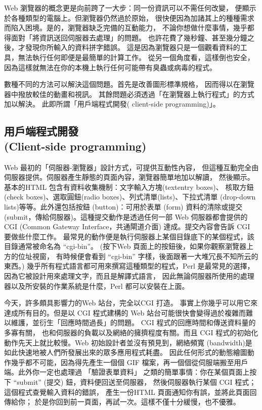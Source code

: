Web 瀏覽器的概念更是向前跨了一大步：同一份資訊可以不需任何改變，
便顯示於各種類型的電腦上。但瀏覽器仍然過於原始，
很快便因為加諸其上的種種需求而陷入困境。是的，瀏覽器缺乏完備的互動能力，
不論你想做什麼事情，幾乎都得面對「將資訊送回伺服器去處理」的問題。
也許花費了幾秒鐘、甚至幾分鐘之後，才發現你所輸入的資料拼字錯誤。
這是因為瀏覽器只是一個觀看資料的工具，無法執行任何即便是最簡單的計算工作。
從另一個角度看，這樣倒也安全，
因為這樣就無法在你的本機上執行任何可能帶有臭蟲或病毒的程式。 

數種不同的方法可以解決這個問題。首先是改善圖形標準規格，
因而得以在瀏覽器中撥放較佳的動畫和視訊。
其餘問題必須透過「在瀏覽器上執行程式」的方式加以解決。
此即所謂「用戶端程式開發( client-side programming)」。
\subsection{用戶端程式開發 \\(Client-side programming)}
Web 最初的「伺服器-瀏覽器」設計方式，可提供互動性內容，
但這種互動完全由伺服器提供。伺服器產生靜態的頁面內容，瀏覽器簡單地加以解讀，
然後顯示。基本的HTML 包含有資料收集機制：文字輸入方塊(textentry boxes)、
核取方鈕(check boxes)、選取圓鈕(radio boxes)、列式清單(lists)、下拉式清單
(drop-down lists)等等。此外還包括按鈕 (button)：可用於表單 (form)
資料的清除或提交(submit，傳給伺服器)。這種提交動作是透過任何一部
Web 伺服器都會提供的 CGI (Common Gateway Interface，共通閘道介面)
達成。提交內容會告訴 CGI 要做些什麼工作。
最常見的動作便是執行伺服器上某個目錄底下的某個程式，該目錄通常被命名為
``cgi-bin''。 (按下Web 頁面上的按鈕後，如果你觀察瀏覽器上方的位址視窗，
有時候便會看到 ``cgi-bin'' 字樣，後面跟著一大堆冗長不知所云的東西。)
幾乎所有程式語言都可用來撰寫這種類型的程式，Perl 是最常見的選擇，
因為它被設計用來處理文字，而且是解譯式語言，
因此無論伺服器所使用的處理器以及所安裝的作業系統是什麼，Perl 都可以安裝在上面。

今天，許多頗具影響力的Web 站台，完全以CGI 打造。
事實上你幾乎可以用它來達成所有目的。但是以 CGI 程式建構的 Web
站台可能很快會變得過於複雜而難以維護，並衍生「回應時間過長」的問題。
CGI 程式的回應時間和傳送資料量的多寡有關，
也和伺服器的負載以及網絡的擁擠程度有關。而且
CGI 程式的初始化動作先天上就比較慢。Web 初始設計者並沒有預見到，網絡頻寬
(bandwidth)是如此快速地被人們所發展出來的眾多應用程式耗盡。
因此任何形式的動態繪圖動作幾乎都不可能，因為得先產生一個個
GIF 檔案，再一個個從伺服端搬至用戶端。此外你一定也處理過 「驗證表單資料」
之類的簡單事情：你在某個頁面上按下 ``submit'' (提交) 鈕，資料便回送至伺服器，
然後伺服器執行某個 CGI 程式；這個程式查覺輸入資料的錯誤，
產生一份HTML 頁面通知你有誤，並將此頁面回傳給你；
於是你回到前一頁面，再試一次。這樣不僅十分緩慢，也不優雅。

